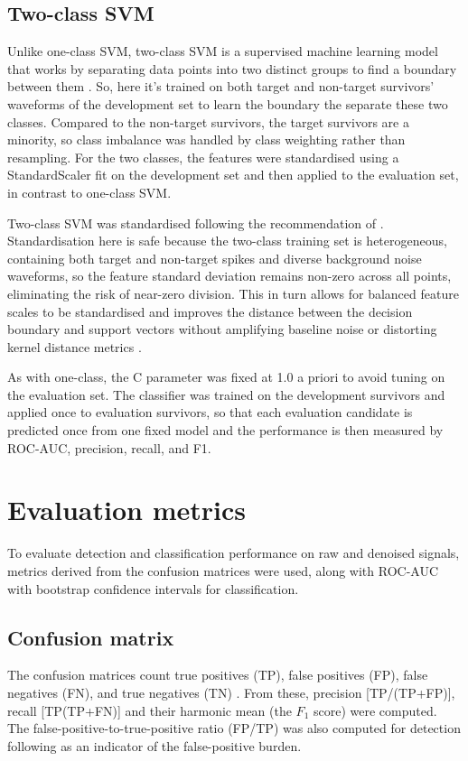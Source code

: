 \documentclass[ %
                    author={Rzan Alkabier},
                    supervisor={Dr. Zahraa Abdallah},
                    degree={MSc},
                     title={Denoising Extracellular Recording for Spike Detection and Classification on Single Channels},
                    subtitle={Does denoising improve detection and classification performance?},
                      type={},
                      year={2026}]{dissertation}
\begin{document}
\subsection{Two-class SVM}
Unlike one-class SVM, two-class SVM is a supervised machine learning model that works by separating data points into two distinct groups to find a boundary between them \cite{krebs_applying_2024}. So, here it's trained on both target and non-target survivors' waveforms of the development set to learn the boundary the separate these two classes. Compared to the non-target survivors, the target survivors are a minority, so class imbalance was handled by class weighting rather than resampling. For the two classes, the features were standardised using a StandardScaler fit on the development set and then applied to the evaluation set, in contrast to one-class SVM. 
\bigskip

\noindent
Two-class SVM was standardised following the recommendation of \cite{carugo_users_2010}. Standardisation here is safe because the two-class training set is heterogeneous, containing both target and non-target spikes and diverse background noise waveforms, so the feature standard deviation remains non-zero across all points, eliminating the risk of near-zero division. This in turn allows for balanced feature scales to be standardised and improves the distance between the decision boundary and support vectors without amplifying baseline noise or distorting kernel distance metrics \cite{cortes_support-vector_1995}. 
\bigskip

\noindent
As with one-class, the C parameter was fixed at 1.0 a priori to avoid tuning on the evaluation set. The classifier was trained on the development survivors and applied once to evaluation survivors, so that each evaluation candidate is predicted once from one fixed model and the performance is then measured by ROC-AUC, precision, recall, and F1. 

\section{Evaluation metrics}
 To evaluate detection and classification performance on raw and denoised signals, metrics derived from the confusion matrices were used, along with ROC-AUC with bootstrap confidence intervals for classification. 
 \subsection{Confusion matrix}
 The confusion matrices count true positives (TP), false positives (FP), false negatives (FN), and true negatives (TN) \cite{singh_diagnosing_2021}. From these, precision [TP/(TP+FP)], recall [TP(TP+FN)] and their harmonic mean (the $F_1$ score) were computed. The false-positive-to-true-positive ratio (FP/TP) was also computed for detection following \cite{troglio_hybrid_2026} as an indicator of the false-positive burden. 
\end{document}
